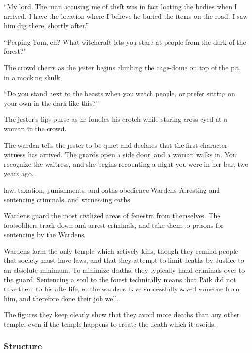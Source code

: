 \begin{multicols}{2}
{    ``My lord.
    The man accusing me of theft was in fact looting the bodies when I arrived.
    I have the location where I believe he buried the items on the road.
    I saw him dig there, shortly after.''

    {\sffamily ``Peeping Tom, eh?
    What witchcraft lets you stare at people from the dark of the forest?''}

    The crowd cheers as the jester begins climbing the cage-dome on top of the pit, in a mocking skulk.

    {\sffamily ``Do you stand next to the beasts when you watch people, or prefer sitting on your own in the dark like this?''}

    The jester's lips purse as he fondles his crotch while staring cross-eyed at a woman in the crowd.

    The warden tells the jester to be quiet and declares that the first character witness has arrived.
    The guards open a side door, and a woman walks in.
    You recognize the waitress, and she begins recounting a night you were in her bar, two years ago\ldots
  }%
  {law, taxation, punishments, and oaths}%
  {obedience}%
  {Wardens}%
  {
    Arresting and sentencing criminals, and witnessing oaths.
  }%

Wardens guard the most civilized areas of \gls{fenestra} from themselves.
The footsoldiers track down and arrest criminals, and take them to prisons for sentencing by the Wardens.

Wardens form the only temple which actively kills, though they remind people that society must have laws, and that they attempt to limit deaths by Justice to an absolute minimum.
To minimize deaths, they typically hand criminals over to the \gls{guard}.
Sentencing a soul to the forest technically means that Paik did not take them to his afterlife, so the wardens have successfully saved someone from him, and therefore done their job well.

The figures they keep clearly show that they avoid more deaths than any other temple, even if the temple happens to create the death which it avoids.

\subsubsection{Structure}


\end{multicols}
